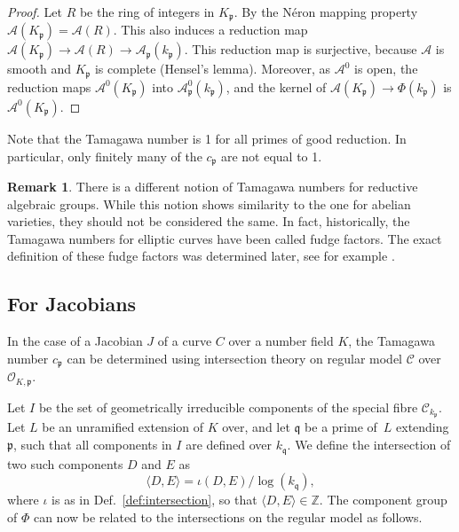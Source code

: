 \documentclass[12pt]{article}
\theoremstyle{definition}
\newtheorem{remark}[theorem]{Remark}
\numberwithin{equation}{subsection}
\newcommand{\Z}{\ensuremath{\mathbb{Z}}}
\begin{document}
\begin{proof}
Let $R$ be the ring of integers in $K_\mathfrak{p}$.
By the N\'eron mapping property $\mathcal{A}(K_\mathfrak{p}) = \mathcal{A}(R)$.
This also induces a reduction map $\mathcal{A}(K_\mathfrak{p}) \to \mathcal{A}(R) \to \mathcal{A}_\mathfrak{p}(k_\mathfrak{p})$. This reduction map is surjective, because $\mathcal{A}$ is smooth and $K_\mathfrak{p}$ is complete (Hensel's lemma).
Moreover, as $\mathcal{A}^0$ is open, the reduction maps $\mathcal{A}^0(K_\mathfrak{p})$ into $\mathcal{A}_\mathfrak{p}^0(k_\mathfrak{p})$, and the kernel of $\mathcal{A}(K_\mathfrak{p}) \to \Phi(k_\mathfrak{p})$ is $\mathcal{A}^0(K_\mathfrak{p})$.
\end{proof}

Note that the Tamagawa number is 1 for all primes of good reduction.
In particular, only finitely many of the $c_\mathfrak{p}$ are not equal to 1.

\begin{remark}
There is a different notion of Tamagawa numbers for reductive algebraic groups.
While this notion shows similarity to the one for abelian varieties, they should not be considered the same.
In fact, historically, the Tamagawa numbers for elliptic curves have been called fudge factors.
The exact definition of these fudge factors was determined later, see for example \cite{Tate}.
\end{remark}

\subsection{For Jacobians}

In the case of a Jacobian $J$ of a curve $C$ over a number field $K$, the Tamagawa number $c_\mathfrak{p}$ can be determined using intersection theory on regular model $\mathcal{C}$ over $\mathcal{O}_{K,\mathfrak{p}}$.

Let $I$ be the set of geometrically irreducible components of the special fibre $\mathcal{C}_{k_\mathfrak{p}}$.
Let $L$ be an unramified extension of $K$ over, and let $\mathfrak{q}$ be a prime of~$L$ extending $\mathfrak{p}$, such that all components in $I$ are defined over $k_\mathfrak{q}$.
We define the intersection of two such components $D$ and $E$ as $$\langle D, E \rangle = \iota(D,E) / \log(k_\mathfrak{q}),$$ where $\iota$ is as in Def.~\ref{def:intersection}, so that $\langle D, E \rangle \in \Z$.
The component group of $\Phi$ can now be related to the intersections on the regular model as follows.
\end{document}
